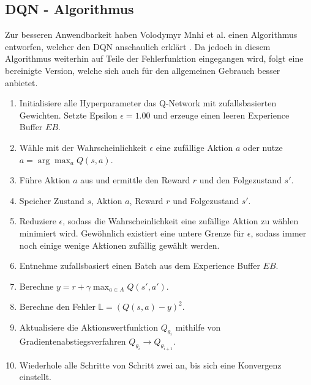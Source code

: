 \subsection{DQN - Algorithmus} \label{subsec:Grundlagen_DQN_Algorithmus}
Zur besseren Anwendbarkeit haben Volodymyr Mnhi et al. einen Algorithmus entworfen, welcher den DQN anschaulich erklärt \citep{DBLP:journals/corr/MnihKSGAWR13}. Da jedoch in diesem Algorithmus weiterhin auf Teile der Fehlerfunktion eingegangen wird, folgt eine bereinigte Version, welche sich auch für den allgemeinen Gebrauch besser anbietet. \citep[S. 149 f.]{DRL_Lapan}
\begin{enumerate} 
	\item Initialisiere alle Hyperparameter das Q-Network mit zufallsbasierten Gewichten. Setzte Epsilon $\epsilon = 1.00$ und erzeuge einen leeren Experience Buffer $EB$.
	\item Wähle mit der Wahrscheinlichkeit $\epsilon$ eine zufällige Aktion $a$ oder nutze $a = \arg\max_{a} Q(s,a)$.
	\item Führe Aktion $a$ aus und ermittle den Reward $r$ und den Folgezustand $s'$.
	\item Speicher Zustand $s$, Aktion $a$, Reward $r$ und Folgezustand $s'$.
	\item Reduziere $\epsilon$, sodass die Wahrscheinlichkeit eine zufällige Aktion zu wählen minimiert wird. Gewöhnlich existiert eine untere Grenze für $\epsilon$, sodass immer noch einige wenige Aktionen zufällig gewählt werden.
	\item Entnehme zufallsbasiert einen Batch aus dem Experience Buffer $EB$.
	\item Berechne $y = r + \gamma \max_{a \in A}Q(s',a')$.
	\item Berechne den Fehler $\mathbb{L} = (Q(s,a) - y)^2$.
	\item Aktualisiere die Aktionswertfunktion $Q_{\theta_{i}}$ mithilfe von Gradientenabstiegsverfahren $Q_{\theta_{i}} \longrightarrow Q_{\theta_{i+1}}$.
	\item Wiederhole alle Schritte von Schritt zwei an, bis sich eine Konvergenz einstellt.
\end{enumerate}

